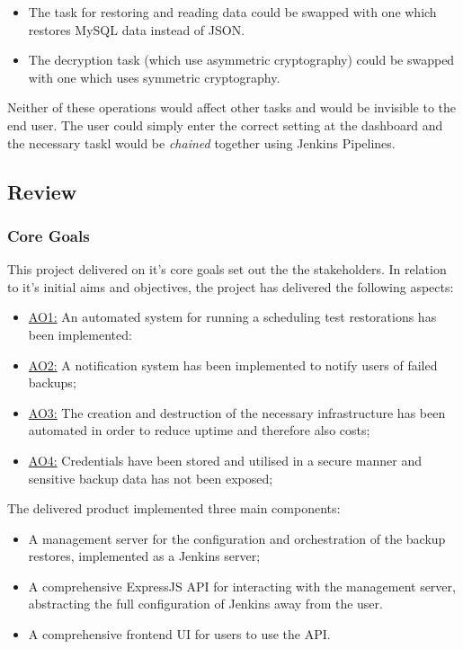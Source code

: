   \begin{itemize}
    \item The task for restoring and reading data could be swapped with one which restores MySQL data instead of JSON.
    \item The decryption task (which use asymmetric cryptography) could be swapped with one which uses symmetric cryptography. 
  \end{itemize}
  Neither of these operations would affect other tasks and would be invisible to the end user.  The user could simply enter the correct setting at the dashboard and the necessary taskl would be \textit{chained} together using Jenkins Pipelines. 

	\subsection{Review}
  
  \subsubsection{Core Goals}
	This project delivered on it's core goals set out the the stakeholders. In relation to it's initial aims and objectives, the project has delivered the following aspects:
  
  \begin{itemize}
    \item \hyperref[ao1]{AO1:} An automated system for running a scheduling test restorations has been implemented:
    \item \hyperref[ao2]{AO2:} A notification system has been implemented to notify users of failed backups;
    \item \hyperref[ao3]{AO3:} The creation and destruction of the necessary infrastructure has been automated in order to reduce uptime and therefore also costs;
    \item \hyperref[ao4]{AO4:} Credentials have been stored and utilised in a secure manner and sensitive backup data has not been exposed;
  \end{itemize}
  
  The delivered product implemented three main components:
  \begin{itemize}
    \item A management server for the configuration and orchestration of the backup restores, implemented as a Jenkins server;
    \item A comprehensive ExpressJS API for interacting with the management server, abstracting the full configuration of Jenkins away from the user.
    \item A comprehensive frontend UI for users to use the API.
  \end{itemize}
  
